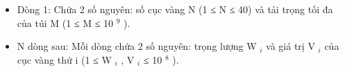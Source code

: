 \begin{itemize}
	\item     Dòng 1: Chứa 2 số nguyên: số cục vàng N (1 ≤ N ≤ 40) và tải trọng tối đa của túi M (1 ≤ M ≤ 10    $^     9    $    ).   
	\item     N dòng sau: Mỗi dòng chứa 2 số nguyên: trọng lượng W    $_     i    $    và giá trị V    $_     i    $    của cục vàng thứ i (1 ≤ W    $_     i    $    , V    $_     i    $    ≤ 10    $^     8    $    ).   
\end{itemize}

\